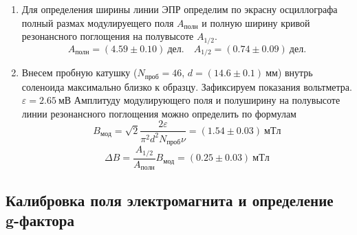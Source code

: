 \documentclass[14pt, a4paper]{report}
\begin{document}
\begin{enumerate}
\item Для определения ширины линии ЭПР определим по экрасну осциллографа полный размах модулируещего поля $A_{полн}$ и полную ширину кривой резонансного поглощения на полувысоте $A_{1/2}$.
\[A_{полн}=(4.59\pm 0.10)\ дел.\quad A_{1/2}=(0.74\pm0.09)\ дел.\]

\item Внесем пробную катушку ($N_{проб}=46$, $d=(14.6\pm0.1)\ мм$) внутрь соленоида максимально близко к образцу. Зафиксируем показания вольтметра. $\varepsilon=2.65\ мВ$ Амплитуду модулирующего поля и полуширину на полувысоте линии резонансного поглощения можно определить по формулам
\[B_{мод}=\sqrt{2}\frac{2\varepsilon}{\pi^2 d^2 N_{проб} \nu}=(1.54\pm0.03)\ мТл\]
\[\Delta B=\frac{A_{1/2}}{A_{полн}}B_{мод}=(0.25\pm0.03)\ мТл\]

\end{enumerate}

\subsection{Калибровка поля электромагнита и определение g-фактора}
\end{document}
